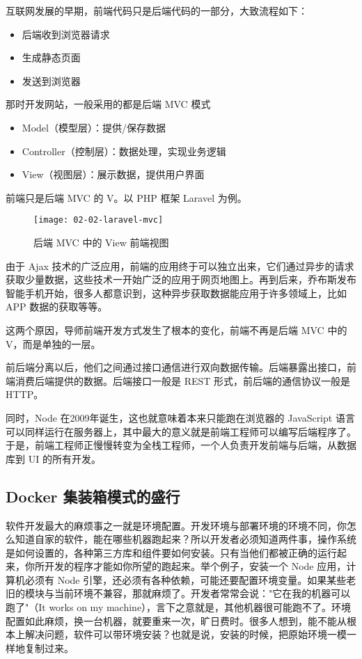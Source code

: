 互联网发展的早期，前端代码只是后端代码的一部分，大致流程如下：

\begin{itemize}
  \item 后端收到浏览器请求
  \item 生成静态页面
  \item 发送到浏览器
\end{itemize}

那时开发网站，一般采用的都是后端 MVC 模式

\begin{itemize}
  \item Model（模型层）：提供/保存数据
  \item Controller（控制层）：数据处理，实现业务逻辑
  \item View（视图层）：展示数据，提供用户界面
\end{itemize}

前端只是后端 MVC 的 V。以 PHP 框架 Laravel 为例。

\begin{figure}[htbp]
\centering
\texttt{[image: 02-02-laravel-mvc]}
\caption{后端 MVC 中的 View 前端视图}
\label{fig:02-02-laravel-mvc}
\end{figure}

由于 Ajax 技术的广泛应用，前端的应用终于可以独立出来，它们通过异步的请求获取少量数据，这些技术一开始广泛的应用于网页地图上。再到后来，乔布斯发布智能手机开始，很多人都意识到，这种异步获取数据能应用于许多领域上，比如 APP 数据的获取等等。

这两个原因，导师前端开发方式发生了根本的变化，前端不再是后端 MVC 中的 V，而是单独的一层。

前后端分离以后，他们之间通过接口通信进行双向数据传输。后端暴露出接口，前端消费后端提供的数据。后端接口一般是 REST 形式，前后端的通信协议一般是 HTTP。

同时，Node 在2009年诞生，这也就意味着本来只能跑在浏览器的 JavaScript 语言可以同样运行在服务器上，其中最大的意义就是前端工程师可以编写后端程序了。于是，前端工程师正慢慢转变为全栈工程师，一个人负责开发前端与后端，从数据库到 UI 的所有开发。

\subsection{Docker 集装箱模式的盛行}
\label{sec:requirements}

软件开发最大的麻烦事之一就是环境配置。开发环境与部署环境的环境不同，你怎么知道自家的软件，能在哪些机器跑起来？所以开发者必须知道两件事，操作系统是如何设置的，各种第三方库和组件要如何安装。只有当他们都被正确的运行起来，你所开发的程序才能如你所望的跑起来。举个例子，安装一个 Node 应用，计算机必须有 Node 引擎，还必须有各种依赖，可能还要配置环境变量。如果某些老旧的模块与当前环境不兼容，那就麻烦了。开发者常常会说："它在我的机器可以跑了"（It works on my machine），言下之意就是，其他机器很可能跑不了。环境配置如此麻烦，换一台机器，就要重来一次，旷日费时。很多人想到，能不能从根本上解决问题，软件可以带环境安装？也就是说，安装的时候，把原始环境一模一样地复制过来。

